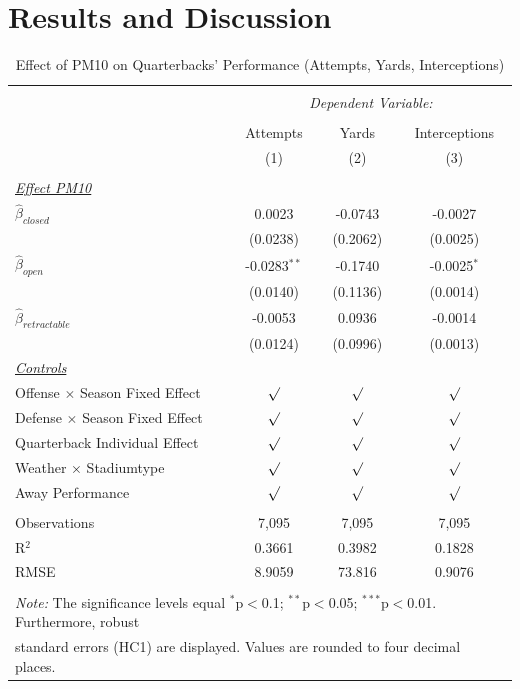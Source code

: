 \documentclass[12pt,a4paper]{article}
\begin{document}
{\clearpage \section{Results and Discussion}
\begin{table}[!htbp] \centering 
  \caption{Effect of PM10 on Quarterbacks' Performance (Attempts, Yards, Interceptions)} 
  \label{T2} 
\begin{tabular}{@{\extracolsep{5pt}}lccc} 
\\[-1.8ex]\hline 
\hline \\[-1.8ex] 
 & \multicolumn{3}{c}{\textit{Dependent Variable:}} \\ \cline{2-4} \\ [-1.8ex]
 & Attempts & Yards & Interceptions \\ 
  & (1) & (2) & (3)\\ \hline \\[-1.8ex] 
 \underline{\textit{Effect PM10}}\\[0.4cm]
  $\hat{\beta}_{closed}$& 0.0023 & -0.0743 & -0.0027 \\ 
  & (0.0238)  & (0.2062)& (0.0025) \\[0.4cm]
  $\hat{\beta}_{open}$& -0.0283$^{**}$ & -0.1740 & -0.0025$^{*}$\\ 
  & (0.0140) & (0.1136) & (0.0014) \\[0.4cm]
  $\hat{\beta}_{retractable}$& -0.0053 & 0.0936 & -0.0014 \\ 
  & (0.0124) & (0.0996) & (0.0013)\\ [0.4cm]
  \underline{\textit{Controls}} \\[0.4cm]
  Offense $\times$ Season Fixed Effect & $\surd$ & $\surd$ & $\surd$ \\[0.4cm]
   Defense $\times$ Season Fixed Effect & $\surd$ & $\surd$  & $\surd$ \\[0.4cm]
    Quarterback Individual Effect & $\surd$ & $\surd$ & $\surd$  \\[0.4cm]
    Weather $\times $ Stadiumtype & $\surd$ & $\surd$ & $\surd$ \\[0.4cm]
    Away Performance & $\surd$ & $\surd$ & $\surd$\\
\hline \\[-1.8ex] 
Observations & 7,095 & 7,095 & 7,095 \\ 
R$^{2}$ & 0.3661 &  0.3982 & 0.1828\\ 
RMSE & 8.9059 & 73.816 & 0.9076\\ \hline 
\hline \\[-1.8ex] 
\multicolumn{4}{l}{\footnotesize \textit{Note:} The significance levels equal {$^{*}$p$<$0.1; $^{**}$p$<$0.05; $^{***}$p$<$0.01}.  Furthermore, robust} \\ \multicolumn{4}{l}{\footnotesize standard errors (HC1) are displayed. Values are rounded to four decimal places.}
  \end{tabular}
\end{table} 


}
\end{document}

